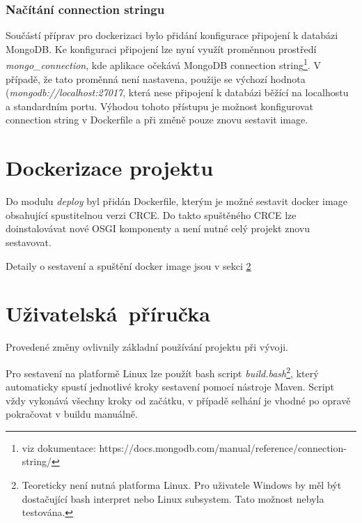 \documentclass[12pt, a4paper]{article}
\begin{document}
\subsubsection{Načítání connection stringu}

Součástí příprav pro dockerizaci bylo přidání konfigurace připojení k databázi MongoDB. Ke konfiguraci připojení lze nyní využít proměnnou prostředí \textit{mongo\_connection}, kde aplikace očekává MongoDB connection string\footnote{viz dokumentace: https://docs.mongodb.com/manual/reference/connection-string/}. V případě, že tato proměnná není nastavena, použije se výchozí hodnota (\textit{mongodb://localhost:27017}, která nese připojení k databázi běžící na localhostu a standardním portu. Výhodou tohoto přístupu je možnost konfigurovat connection string v Dockerfile a při změně pouze znovu sestavit image.


\section{Dockerizace projektu}
Do modulu \textit{deploy} byl přidán Dockerfile, kterým je možné sestavit docker image obsahující spustitelnou verzi CRCE. Do takto spuštěného CRCE lze doinstalovávat nové OSGI komponenty a není nutné celý projekt znovu sestavovat. 

Detaily o sestavení a spuštění docker image jsou v sekci \ref{sec:manual}

\section{Uživatelská~příručka}
\label{sec:manual} %

Provedené změny ovlivnily základní používání projektu při vývoji. 

Pro sestavení na platformě Linux lze použít bash script \textit{build.bash}\footnote{Teoreticky není nutná platforma Linux. Pro uživatele Windows by měl být dostačující bash interpret nebo Linux subsystem. Tato možnost nebyla testována.}, který automaticky spustí jednotlivé kroky sestavení pomocí nástroje Maven. Script vždy vykonává všechny kroky od začátku, v případě selhání je vhodné po opravě pokračovat v buildu manuálně.
\end{document}
